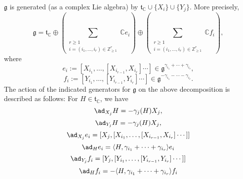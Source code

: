 \documentclass[reqno]{amsart} 
\begin{document}
\begin{corollary}\label{cor:g-gen-via-simple-stuff}
  $\mathfrak{g}$ is generated (as a complex Lie algebra) by $\mathfrak{t}_{\mathbb{C}} \cup \{X_i\} \cup \{Y_j\}$.  More precisely,
  \begin{equation}\label{eqn:decomposition-frak-g-via-simple-root-vecs}
    \mathfrak{g} =
    \mathfrak{t}_{\mathbb{C}}
    \oplus
    (
    \sum _{ \substack{
        r \geq 1 \\
        i = (i_1,\dotsc,i_r) \in \mathbb{Z}_{\geq 1}^r
      }
    }
    \mathbb{C} e_i
    )
    \oplus
    (
    \sum _{ \substack{
        r \geq 1 \\
        i = (i_1,\dotsc,i_r) \in \mathbb{Z}_{\geq 1}^r
      }
    }
    \mathbb{C} f_i
    ),
  \end{equation}
  where
  \begin{equation}\label{eqn:defn-e-i}
    e_i := [X_{i_1},\dotsc,[X_{i_{r-1}}, X_{i_r}]\dotsb]
    \in \mathfrak{g}^{\gamma_{i_1} + \dotsb + \gamma_{i_r}},
  \end{equation}
  \begin{equation}\label{eqn:defn-f-i}
    f_i := [Y_{i_1},\dotsc,[Y_{i_{r-1}}, Y_{i_r}]\dotsb]
    \in \mathfrak{g}^{-\gamma_{i_1} - \dotsb - \gamma_{i_r}}.
  \end{equation}
  The action of the indicated generators for $\mathfrak{g}$ on the above decomposition is described as follows: For $H \in \mathfrak{t}_{\mathbb{C}}$, we have
  \begin{equation*}
    \ad_{X_j}
    H = -\gamma_j(H) X_j,
  \end{equation*}
  \begin{equation*}
    \ad_{Y_j}
    H = -\gamma_j(H) X_j,
  \end{equation*}
  \begin{equation*}
    \ad_{X_j}
    e_i
    =
    [X_j, [X_{i_1},\dotsc,[X_{i_{r-1}}, X_{i_r}]\dotsb]]
  \end{equation*}
  \begin{equation*}
    \ad_{H}
    e_i
    =
    \langle H, \gamma_{i_1} + \dotsb + \gamma_{i_r} \rangle
    e_i
  \end{equation*}
  \begin{equation*}
    \ad_{Y_j}
    f_i
    =
    [Y_j, [Y_{i_1},\dotsc,[Y_{i_{r-1}}, Y_{i_r}]\dotsb]]
  \end{equation*}
  \begin{equation*}
    \ad_{H}
    f_i
    =
    -\langle H, \gamma_{i_1} + \dotsb + \gamma_{i_r} \rangle
    f_i
  \end{equation*}

\end{corollary}
\end{document}
